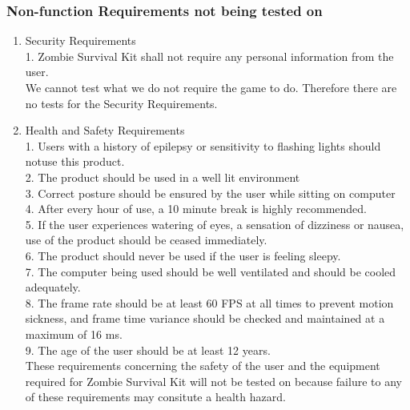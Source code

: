 \documentclass[12pt, titlepage]{article}
\begin{document}
\subsubsection{Non-function Requirements not being tested on}

\begin{enumerate}
	
	\item{Security Requirements\\}
	1. Zombie Survival Kit shall not require any personal information from the user.\\
	
	We cannot test what we do not require the game to do. Therefore there are no tests for the Security Requirements.
	
	\item{Health and Safety Requirements\\}
	1. Users with a history of epilepsy or sensitivity to flashing lights should notuse this product.\\
	
	2. The product should be used in a well lit environment\\
	
	3. Correct posture should be ensured by the user while sitting on computer\\
	
	4. After every hour of use, a 10 minute break is highly recommended.\\
	
	5. If the user experiences watering of eyes, a sensation of dizziness or nausea,\\
	
	use of the product should be ceased immediately.\\
	
	6. The product should never be used if the user is feeling sleepy.\\
	
	7. The computer being used should be well ventilated and should be cooled adequately.\\
	
	8. The frame rate should be at least 60 FPS at all times to prevent motion sickness, and frame time variance should be checked and maintained at a maximum of 16 ms.\\
	
	9. The age of the user should be at least 12 years. \\
	
	These requirements concerning the safety of the user and the equipment required for Zombie Survival Kit will not be tested on because failure to any of these requirements may consitute a health hazard.\\
	
	
\end{enumerate}
\end{document}
